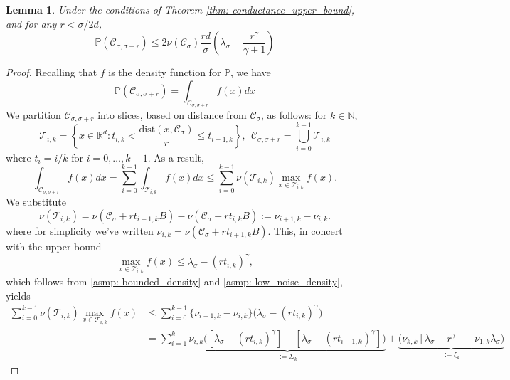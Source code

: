 \documentclass{article}
\newcommand{\set}[1]{\left\{#1\right\}}
\newcommand{\N}{\mathbb{N}}
\newcommand{\Reals}{\mathbb{R}}
\newcommand{\Rd}{\Reals^d}
\newcommand{\1}{\mathbf{1}}
\newcommand{\dist}{\mathrm{dist}}
\newcommand{\Pbb}{\mathbb{P}}
\newcommand{\Cset}{\mathcal{C}}
\newcommand{\Csig}{\Cset_{\sigma}}
\newcommand{\Csigr}{\Cset_{\sigma,\sigma + r}}
\theoremstyle{aldenthm}
\newtheorem{lemma}{Lemma}
\begin{document}
\begin{lemma}
	\label{lem: expected_number_boundary_points}
	Under the conditions of Theorem \ref{thm: conductance_upper_bound}, and for any $r < \sigma/2d$,
	\begin{equation*}
	\Pbb(\Csigr) \leq 2 \nu(\Csig) \frac{rd}{\sigma}  \left(\lambda_{\sigma} - \frac{r^{\gamma}}{\gamma + 1}\right)
	\end{equation*}	
\end{lemma}
\begin{proof}
	Recalling that $f$ is the density function for $\Pbb$, we have
	\begin{equation}
	\label{eqn: integral_over_epsilon_neighborhood}
	\Pbb(\Csigr) = \int_{\Csigr} f(x) dx
	\end{equation}
	We partition $\Csigr$ into slices, based on distance from $\Csig$, as follows: for $k \in \N$,
	\begin{equation*}
	\mathcal{T}_{i,k} = \set{x \in \Rd: t_{i,k} < \frac{\dist(x, \Csig)}{r} \leq t_{i+1,k}}, ~~ \Csigr = \bigcup_{i = 0}^{k-1} \mathcal{T}_{i,k}
	\end{equation*}
	where $t_i = i/k$ for $i = 0, \ldots, k - 1$. As a result,
	\begin{equation*}
	\int_{\Csigr} f(x) dx = \sum_{i = 0}^{k-1} \int_{\mathcal{T}_{i,k}} f(x) dx \leq \sum_{i = 0}^{k-1} \nu(\mathcal{T}_{i,k}) \max_{x \in \mathcal{T}_{i,k}} f(x).
	\end{equation*}
	We substitute
	\begin{equation*}
	\nu(\mathcal{T}_{i,k}) = \nu(\Csig + rt_{i+1,k}B) - \nu(\Csig + rt_{i,k}B) := \nu_{i+1,k} - \nu_{i,k}. 
	\end{equation*}
	where for simplicity we've written $\nu_{i,k} = \nu(\Csig + rt_{i+1,k}B)$.
	This, in concert with the upper bound
	\begin{equation*}
	\max_{x \in \mathcal{T}_{i,k}} f(x) \leq \lambda_{\sigma} - (rt_{i,k})^{\gamma},
	\end{equation*}
	which follows from \ref{asmp: bounded_density} and \ref{asmp: low_noise_density}, yields
	\begin{align}
	\label{eqn: telescoping_sum}
	\sum_{i = 0}^{k-1} \nu(\mathcal{T}_{i,k}) \max_{x \in \mathcal{T}_{i,k}} f(x) & \leq \sum_{i = 0}^{k-1} \biggl\{ \nu_{i+1,k} - \nu_{i,k} \biggr\} \biggl( \lambda_{\sigma} - (rt_{i,k})^{\gamma} \biggr) \nonumber \\
	& = \sum_{i = 1}^{k} 
	\underbrace{\nu_{i,k} \biggl( \left[\lambda_{\sigma} - (rt_{i,k})^{\gamma}\right] -  \left[\lambda_{\sigma} - (rt_{i-1,k})^{\gamma}\right]\biggr)}_{:= \Sigma_k} + \underbrace{\biggl(\nu_{k,k}\left[\lambda_{\sigma} - r^{\gamma}\right] - \nu_{1,k}\lambda_{\sigma} \biggr)}_{:= \xi_k}
	\end{align}
	

\end{proof}
\end{document}
